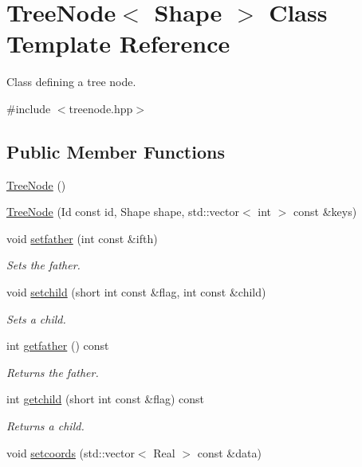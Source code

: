 \hypertarget{classTreeNode}{
\section{TreeNode$<$ Shape $>$ Class Template Reference}
\label{classTreeNode}
}


Class defining a tree node.  


{\ttfamily \#include $<$treenode.hpp$>$}\subsection*{Public Member Functions}
\begin{DoxyCompactItemize}
\item 
\hyperlink{classTreeNode_a0b76dda42f063815700904c6861055b2}{TreeNode} ()
\item 
\hyperlink{classTreeNode_a8fc5141645c0a2131e3d4148da085165}{TreeNode} (Id const id, Shape shape, std::vector$<$ int $>$ const \&keys)
\item 
\hypertarget{classTreeNode_a8625cb7bfd1b093017060c0573fd5264}{
void \hyperlink{classTreeNode_a8625cb7bfd1b093017060c0573fd5264}{setfather} (int const \&ifth)}
\label{classTreeNode_a8625cb7bfd1b093017060c0573fd5264}

\begin{DoxyCompactList}\small\item\em Sets the father. \item\end{DoxyCompactList}\item 
void \hyperlink{classTreeNode_a5dc66c89b3e2a3a46600f08f0dad5b80}{setchild} (short int const \&flag, int const \&child)
\begin{DoxyCompactList}\small\item\em Sets a child. \item\end{DoxyCompactList}\item 
\hypertarget{classTreeNode_a687e35a6d01acbc98f0f7ba385548122}{
int \hyperlink{classTreeNode_a687e35a6d01acbc98f0f7ba385548122}{getfather} () const }
\label{classTreeNode_a687e35a6d01acbc98f0f7ba385548122}

\begin{DoxyCompactList}\small\item\em Returns the father. \item\end{DoxyCompactList}\item 
int \hyperlink{classTreeNode_ae48bc7d93db5bbbfb8950cf309e17cb3}{getchild} (short int const \&flag) const 
\begin{DoxyCompactList}\small\item\em Returns a child. \item\end{DoxyCompactList}\item 
\hypertarget{classTreeNode_ad659a94dd818b13ec165033caccedd22}{
void \hyperlink{classTreeNode_ad659a94dd818b13ec165033caccedd22}{setcoords} (std::vector$<$ Real $>$ const \&data)}
\label{classTreeNode_ad659a94dd818b13ec165033caccedd22}


\end{DoxyCompactItemize}
